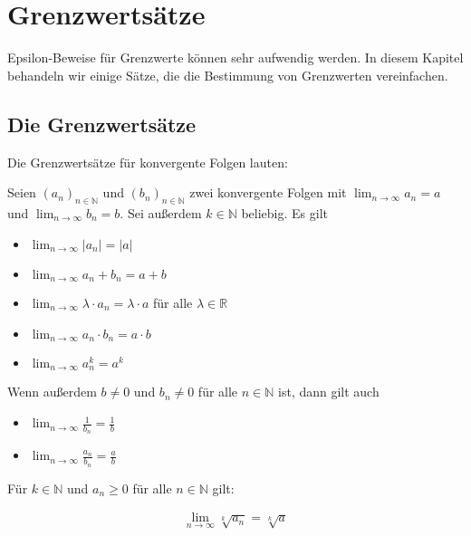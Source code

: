 \documentclass[fontsize=9pt,
               parskip=half-,
               DIV=14,
               listof=chapterentry,
               tocflat]{scrbook}
\begin{document}
\chapter{Grenzwertsätze}

Epsilon-Beweise für Grenzwerte können sehr aufwendig werden. In diesem Kapitel behandeln wir einige Sätze, die die Bestimmung von Grenzwerten vereinfachen.

\section{Die Grenzwertsätze}

Die Grenzwertsätze für konvergente Folgen lauten:

\begin{theorem*}[Grenzwertsätze]
Seien $\left(a_{n}\right)_{n\in \mathbb {N} }$ und $\left(b_{n}\right)_{n\in \mathbb {N} }$ zwei konvergente Folgen mit $\lim _{n\rightarrow \infty }a_{n}=a$ und $\lim _{n\rightarrow \infty }b_{n}=b$. Sei außerdem $k\in \mathbb {N} $ beliebig. Es gilt

\begin{itemize}
\item $\lim _{n\rightarrow \infty }|a_{n}|=|a|$
\item $\lim _{n\rightarrow \infty }a_{n}+b_{n}=a+b$
\item $\lim _{n\rightarrow \infty }\lambda \cdot a_{n}=\lambda \cdot a$ für alle $\lambda \in \mathbb {R} $
\item $\lim _{n\rightarrow \infty }a_{n}\cdot b_{n}=a\cdot b$
\item $\lim _{n\rightarrow \infty }a_{n}^{k}=a^{k}$
\end{itemize}

Wenn außerdem $b\neq 0$ und $b_{n}\neq 0$ für alle $n\in \mathbb {N} $ ist, dann gilt auch

\begin{itemize}
\item $\lim _{n\rightarrow \infty }{\frac {1}{b_{n}}}={\frac {1}{b}}$
\item $\lim _{n\rightarrow \infty }{\frac {a_{n}}{b_{n}}}={\frac {a}{b}}$
\end{itemize}

Für $k\in \mathbb {N} $ und $a_{n}\geq 0$ für alle $n\in \mathbb {N} $ gilt:

\begin{align*}
\lim _{n\rightarrow \infty }{\sqrt[{k}]{a_{n}}}={\sqrt[{k}]{a}}
\end{align*}

\end{theorem*}
\end{document}
